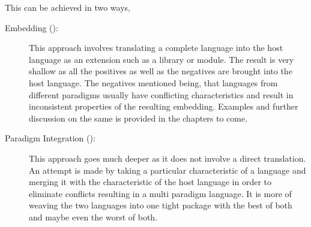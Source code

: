 \documentclass[thesis-solanki.tex]{subfiles}
\begin{document}
This can be achieved in two ways,
\begin{description}
\item [Embedding ():]

  This approach involves\xxx{,} translating a complete language into the host language as an extension such as a
  library  or module\xxx{ }.
  The result is very shallow as all the positives as well as the negatives are brought into the host language.
  The negatives mentioned being, that languages from different paradigms usually have conflicting characteristics
  and result in inconsistent properties of the resulting embedding.
  Examples and further discussion on the same is provided in the chapters to come.

\item [Paradigm Integration ():]

  This approach goes much deeper as it does not involve a direct translation.
  An attempt is made by taking a particular characteristic of a language and merging it with the characteristic of
  the host language in order to eliminate conflicts resulting in a multi paradigm language.
  It is more of weaving the two languages into one tight package with the best of both and maybe even the worst of
  both.
\end{description}


%






\end{document}
